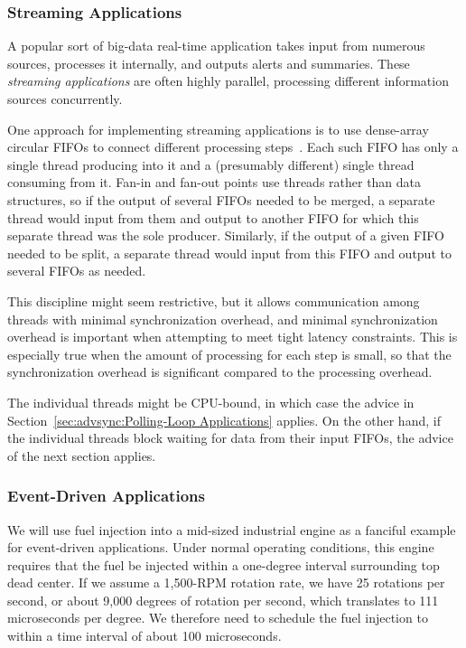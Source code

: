 \subsubsection{Streaming Applications}
\label{sec:advsync:Streaming Applications}

A popular sort of big-data real-time application takes input from numerous
sources, processes it internally, and outputs alerts and summaries.
These \emph{streaming applications} are often highly parallel, processing
different information sources concurrently.

One approach for implementing streaming applications is to use
dense-array circular FIFOs to connect different processing
steps~\cite{AdrianSutton2013LCA:Disruptor}.
Each such FIFO has only a single thread producing into it and a
(presumably different) single thread consuming from it.
Fan-in and fan-out points use threads rather than data structures,
so if the output of several FIFOs needed to be merged, a separate
thread would input from them and output to another FIFO for which
this separate thread was the sole producer.
Similarly, if the output of a given FIFO needed to be split, a separate
thread would input from this FIFO and output to several FIFOs as needed.

This discipline might seem restrictive, but it allows communication
among threads with minimal synchronization overhead, and minimal
synchronization overhead is important when attempting to meet
tight latency constraints.
This is especially true when the amount of processing for each step
is small, so that the synchronization overhead is significant compared
to the processing overhead.

The individual threads might be CPU-bound, in which case the advice in
Section~\ref{sec:advsync:Polling-Loop Applications} applies.
On the other hand, if the individual threads block waiting for
data from their input FIFOs, the advice of the next section applies.

\subsubsection{Event-Driven Applications}
\label{sec:advsync:Event-Driven Applications}

We will use fuel injection into a mid-sized industrial engine as a
fanciful example for event-driven applications.
Under normal operating conditions, this engine requires that the fuel
be injected within a one-degree interval surrounding top dead center.
If we assume a 1,500-RPM rotation rate, we have 25 rotations per second,
or about 9,000 degrees of rotation per second, which translates to
111 microseconds per degree.
We therefore need to schedule the fuel injection to within a time
interval of about 100 microseconds.

